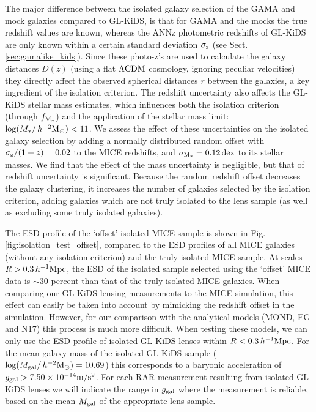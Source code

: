 \documentclass[usenatbib]{mnras}
\newcommand{\hmsun}{\,h^{-2} {\rm M_\odot}}
\newcommand{\hMpc}{\, h^{-1}{\rm{Mpc}} }
\newcommand{\mpss}{ {\rm m/s^2} }
\newcommand{\lcdm}{{\rm \Lambda CDM}}
\newcommand*{\E}[1]{\times 10^{#1}}
\newcommand{\un}[1]{_{\rm #1}}
\newcommand{\dex}{\, {\rm dex}}
\begin{document}
The major difference between the isolated galaxy selection of the GAMA and mock galaxies compared to GL-KiDS, is that for GAMA and the mocks the true redshift values are known, whereas the ANNz photometric redshifts of GL-KiDS are only known within a certain standard deviation $\sigma\un{z}$ (see Sect. \ref{sec:gamalike_kids}). Since these photo-z's are used to calculate the galaxy distances $D(z)$ (using a flat $\lcdm$ cosmology, ignoring peculiar velocities) they directly affect the observed spherical distances $r$ between the galaxies, a key ingredient of the isolation criterion. The redshift uncertainty also affects the GL-KiDS stellar mass estimates, which influences both the isolation criterion (through $f\un{M_*}$) and the application of the stellar mass limit: $\log(M_*/\hmsun) < 11$. We assess the effect of these uncertainties on the isolated galaxy selection by adding a normally distributed random offset with $\sigma\un{z}/(1+z) = 0.02$ to the MICE redshifts, and $\sigma\un{M_*} = 0.12 \dex$ to its stellar masses. We find that the effect of the mass uncertainty is negligible, but that of redshift uncertainty is significant. Because the random redshift offset decreases the galaxy clustering, it increases the number of galaxies selected by the isolation criterion, adding galaxies which are not truly isolated to the lens sample (as well as excluding some truly isolated galaxies). %

The ESD profile of the `offset' isolated MICE sample is shown in Fig. \ref{fig:isolation_test_offset}, compared to the ESD profiles of all MICE galaxies (without any isolation criterion) and the truly isolated MICE sample. At scales $R > 0.3 \hMpc$, the ESD of the isolated sample selected using the `offset' MICE data is $\sim 30$ percent than that of the truly isolated MICE galaxies. When comparing our GL-KiDS lensing measurements to the MICE simulation, this effect can easily be taken into account by mimicking the redshift offset in the simulation. However, for our comparison with the analytical models (MOND, EG and N17) this process is much more difficult. When testing these models, we can only use the ESD profile of isolated GL-KiDS lenses within $R < 0.3 \hMpc$. For the mean galaxy mass of the isolated GL-KiDS sample ($\log(M\un{gal}/\hmsun) = 10.69$) this corresponds to a baryonic acceleration of $g\un{gal}>7.50\E{-14} \mpss$. For each RAR measurement resulting from isolated GL-KiDS lenses we will indicate the range in $g\un{gal}$ where the measurement is reliable, based on the mean $M\un{gal}$ of the appropriate lens sample.
\end{document}
